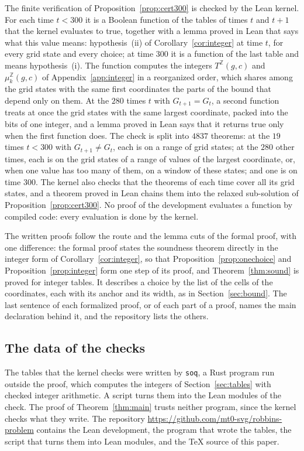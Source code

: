 \documentclass[11pt]{amsart}
\newcommand{\repo}{https://github.com/mt0-svg/robbins-problem}
\theoremstyle{definition}
\numberwithin{equation}{section}
\newcommand{\computed}[1]{\ignorespaces}
\begin{document}
The finite verification of Proposition~\ref{prop:cert300} is checked by the Lean kernel. For each time $t<300$ it is a Boolean function of the tables of times $t$ and $t+1$ that the kernel evaluates to true, together with a lemma proved in Lean that says what this value means: hypothesis~(ii) of Corollary~\ref{cor:integer} at time $t$, for every grid state and every choice; at time $300$ it is a function of the last table and means hypothesis~(i). The function computes the integers $T^{\mathbb Z}(g,c)$ and $\mu^{\mathbb Z}_k(g,c)$ of Appendix~\ref{app:integer} in a reorganized order, which shares among the grid states with the same first coordinates the parts of the bound that depend only on them. At the $280$ times $t$ with $G_{t+1}=G_t$, a second function treats at once the grid states with the same largest coordinate, packed into the bits of one integer, and a lemma proved in Lean says that it returns true only when the first function does. The check is split into $4837$ theorems: at the $19$ times $t<300$ with $G_{t+1}\ne G_t$, each is on a range of grid states; at the $280$ other times, each is on the grid states of a range of values of the largest coordinate, or, when one value has too many of them, on a window of these states; and one is on time $300$. The kernel also checks that the theorems of each time cover all its grid states, and a theorem proved in Lean chains them into the relaxed sub-solution of Proposition~\ref{prop:cert300}. No proof of the development evaluates a function by compiled code: every evaluation is done by the kernel.

The written proofs follow the route and the lemma cuts of the formal proof, with one difference: the formal proof states the soundness theorem directly in the integer form of Corollary~\ref{cor:integer}, so that Proposition~\ref{prop:onechoice} and Proposition~\ref{prop:integer} form one step of its proof, and Theorem~\ref{thm:sound} is proved for integer tables. It describes a choice by the list of the cells of the coordinates, each with its anchor and its width, as in Section~\ref{sec:bound}. The last sentence of each formalized proof, or of each part of a proof, names the main declaration behind it, and the repository lists the others.

\subsection{The data of the checks}\label{sec:formal-data}\computed{code/soq/src/bin/soq.rs, code/soq/out/soq-m5-n300-r1.3-w0.35-14.txt}
The tables that the kernel checks were written by \texttt{soq}, a Rust program run outside the proof, which computes the integers of Section~\ref{sec:tables} with checked integer arithmetic. A script turns them into the Lean modules of the check. The proof of Theorem~\ref{thm:main} trusts neither program, since the kernel checks what they write. The repository \url{\repo} contains the Lean development, the program that wrote the tables, the script that turns them into Lean modules, and the \TeX{} source of this paper.
\end{document}
